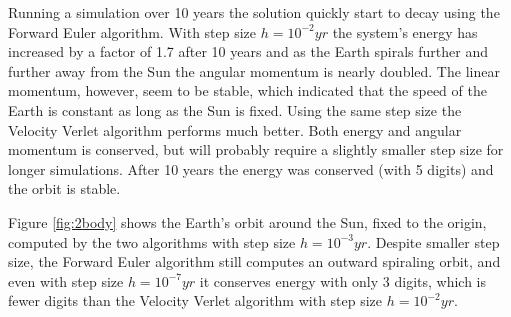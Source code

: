 \documentclass{article}
\begin{document}
Running a simulation over 10 years the solution quickly start to decay using the Forward Euler algorithm. With step size $h=10^{-2}yr$ the system's energy has increased by a factor of 1.7 after 10 years and as the Earth spirals further and further away from the Sun the angular momentum is nearly doubled. The linear momentum, however, seem to be stable, which indicated that the speed of the Earth is constant as long as the Sun is fixed. Using the same step size the Velocity Verlet algorithm performs much better. Both energy and angular momentum is conserved, but will probably require a slightly smaller step size for longer simulations. After 10 years the energy was conserved (with 5 digits) and the orbit is stable.

Figure \ref{fig:2body} shows the Earth's orbit around the Sun, fixed to the origin, computed by the two algorithms with step size $h=10^{-3}yr$. Despite smaller step size, the Forward Euler algorithm still computes an outward spiraling orbit, and even with step size $h=10^{-7}yr$ it conserves energy with only 3 digits, which is fewer digits than the Velocity Verlet algorithm with step size $h=10^{-2}yr$. 
\end{document}
